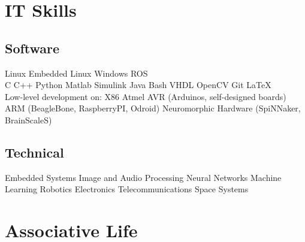 \documentclass[a4paper]{deedy-resume} %
\begin{document}
\begin{minipage}[b]{0.47\linewidth}
	
	
	\section{IT Skills}
	\vspace{5pt}
	\subsection{Software}
	\vspace{2pt}
	Linux \textbullet{} Embedded Linux \textbullet{} Windows \textbullet{} ROS\\
	\vspace{3pt}
	C \textbullet{} C++ \textbullet{} Python \textbullet{} Matlab \textbullet{} Simulink \textbullet{} Java \textbullet{} Bash \textbullet{} VHDL \textbullet{} OpenCV \textbullet{} Git \textbullet{} \LaTeX\\
	\vspace{3pt}
	Low-level development on: X86 \textbullet{} Atmel AVR (Arduinos, self-designed boards) \textbullet{} ARM (BeagleBone, RaspberryPI, Odroid) \textbullet{} Neuromorphic Hardware (SpiNNaker, BrainScaleS)
	\vspace{5pt}
	
	\subsection{Technical}
	Embedded Systems \textbullet{}
	Image and Audio Processing \textbullet{} Neural Networks \textbullet{} Machine Learning \textbullet{} Robotics \textbullet{} Electronics \textbullet{} Telecommunications \textbullet{} Space Systems
\end{minipage}
\vspace{5pt}



\section{Associative Life}
\vspace{5pt}
\end{document}
